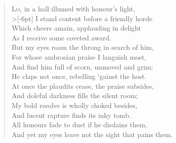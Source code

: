 \documentclass[a5paper, 12pt, oneside]{memoir}
\begin{document}
\PoemTitle{}
\begin{verse}
    \lettrine{L}{o}, in a hall illumed with honour's light, \\>[-6pt]
    I stand content before a friendly horde \\
    Which cheers amain, applauding in delight \\
    As I receive some coveted award. \\
    But my eyes roam the throng in search of him, \\
    For whose ambrosian praise I languish most, \\
    And find him full of scorn, unmoved and grim; \\
    He claps not once, rebelling `gainst the host. \\
    At once the plaudits cease, the praise subsides, \\
    And doleful darkness fills the silent room; \\
    My bold resolve is wholly choked besides, \\
    And lucent rapture finds its inky tomb. \\
    \vin All honours fade to dust if he disdains them, \\
    \vin And yet my eyes leave not the sight that pains them.
\end{verse}
\end{document}
